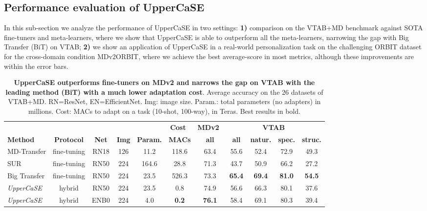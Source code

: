 \documentclass{article}
\begin{document}
\subsection{Performance evaluation of UpperCaSE} \label{ssec:analysis_uppercase}

In this sub-section we analyze the performance of UpperCaSE in two settings: \textbf{1)} comparison on the VTAB+MD benchmark against SOTA fine-tuners and meta-learners, where we show that UpperCaSE is able to outperform all the meta-learners, narrowing the gap with Big Transfer (BiT) on VTAB; \textbf{2)} we show an application of UpperCaSE in a real-world personalization task on the challenging ORBIT dataset \citep{massiceti2021orbit} for the cross-domain condition MDv2ORBIT, where we achieve the best average-score in most metrics, although these improvements are within the error bars.


\begin{table}[!h]
\caption{\textbf{UpperCaSE outperforms fine-tuners on MDv2 and narrows the gap on VTAB with the leading method (BiT) with a much lower adaptation cost}. Average accuracy on the 26 datasets of VTAB+MD. RN=ResNet, EN=EfficientNet. Img: image size. Param.: total parameters (no adapters) in millions. Cost: MACs to adapt on a task (10-shot, 100-way), in Teras. 
Best results in bold.}
\vskip 0.1in
\begin{adjustbox}{width=1.0\textwidth,center}
\begin{tabular}{lcccccccccc}
\toprule
 & & & & & \multicolumn{1}{c}{\textbf{Cost}~} & \multicolumn{1}{c}{\textbf{MDv2}~} & \multicolumn{4}{c}{\textbf{VTAB}~} \\
 \cmidrule(lr){6-6} \cmidrule(lr){7-7} \cmidrule(lr){8-11}
 \textbf{Method} & \textbf{Protocol} & \textbf{Net} & \textbf{Img} & \textbf{Param.} & \textbf{MACs} & \textbf{all} & \textbf{all} & \textbf{natur.}  & \textbf{spec.} & \textbf{struc.} \\
\midrule
MD-Transfer & fine-tuning & RN18 & 126 & 11.2 & 118.6 & 63.4 & 55.6 & 52.4 & 72.9 & 49.3 \\ 
SUR & fine-tuning & RN50 & 224 & 164.6 & 28.8 & 71.3 & 43.7 & 50.9 & 66.2 & 27.2 \\
Big Transfer & fine-tuning & RN50 & 224 & 23.5 & 526.3 & 73.3 & \textbf{65.4} & \textbf{69.4} & \textbf{81.0} & \textbf{54.5} \\
\midrule
\emph{UpperCaSE} & hybrid & RN50 & 224 & 23.5 & 0.8 & 74.9 & 56.6 & 66.3 & 80.1 & 37.6 \\
\emph{UpperCaSE} & hybrid & ENB0 & 224 & 4.0 & \textbf{0.2} & \textbf{76.1} & 58.4 & 69.1 & 80.3 & 39.4 \\
\bottomrule
\end{tabular}
\end{adjustbox}
\label{tab:uppercase_vs_finetuners_vtab_md_results}
\end{table}
\end{document}
